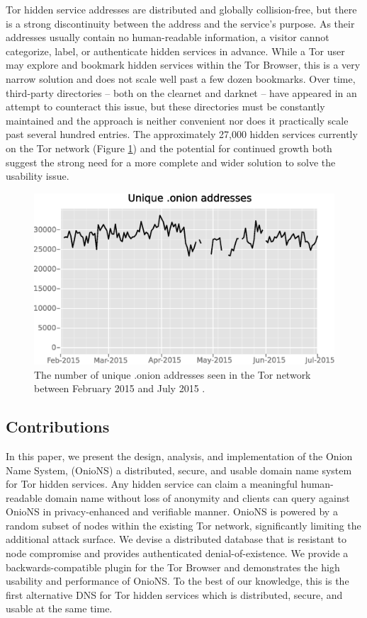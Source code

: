 \documentclass[USenglish,oneside,twocolumn]{article}
\begin{document}
Tor hidden service addresses are distributed and globally collision-free, but there is a strong discontinuity between the address and the service's purpose. As their addresses usually contain no human-readable information, a visitor cannot categorize, label, or authenticate hidden services in advance. While a Tor user may explore and bookmark hidden services within the Tor Browser, this is a very narrow solution and does not scale well past a few dozen bookmarks. Over time, third-party directories -- both on the clearnet and darknet -- have appeared in an attempt to counteract this issue, but these directories must be constantly maintained and the approach is neither convenient nor does it practically scale past several hundred entries. The approximately 27,000 hidden services currently on the Tor network (Figure \ref{fig:OnionCount}) and the potential for continued growth both suggest the strong need for a more complete and wider solution to solve the usability issue.

\begin{figure}[htbp]
	\centering
	\includegraphics[width=\linewidth]{../assets/images/Tor/onion_2015-02_2015-07.eps}
	\caption{The number of unique .onion addresses seen in the Tor network between February 2015 and July 2015 \cite{kadianakis2015extrapolating}\cite{TorMetrics}.}
	\label{fig:OnionCount}
\end{figure}

\subsection{Contributions}

In this paper, we present the design, analysis, and implementation of the Onion Name System, (OnioNS) a distributed, secure, and usable domain name system for Tor hidden services. Any hidden service can claim a meaningful human-readable domain name without loss of anonymity and clients can query against OnioNS in privacy-enhanced and verifiable manner. OnioNS is powered by a random subset of nodes within the existing Tor network, significantly limiting the additional attack surface. We devise a distributed database that is resistant to node compromise and provides authenticated denial-of-existence. We provide a backwards-compatible plugin for the Tor Browser and demonstrates the high usability and performance of OnioNS. To the best of our knowledge, this is the first alternative DNS for Tor hidden services which is distributed, secure, and usable at the same time.
\end{document}
